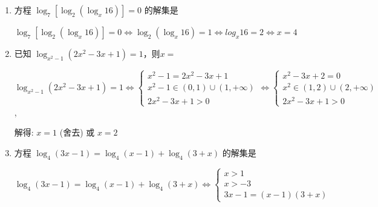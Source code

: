 \begin{enumerate}
    \item 方程 ${\log }_{7}\left\lbrack  {{\log }_{2}\left( {{\log }_{x}{16}}\right) }\right\rbrack   = 0$ 的解集是
    \begin{jieda}
        ${\log }_{7}\left\lbrack  {{\log }_{2}\left( {{\log }_{x}{16}}\right) }\right\rbrack   = 0 \Longleftrightarrow {{\log }_{2}\left( {{\log }_{x}{16}}\right) } = 1 \Longleftrightarrow log_x16 = 2 \Longleftrightarrow x = 4$
    \end{jieda}
    \item 已知 ${\log }_{{x}^{2} - 1}\left( {2{x}^{2} - {3x} + 1}\right)  = 1$，则$x = $
    \begin{jieda}
    
        ${\log }_{{x}^{2} - 1}\left( {2{x}^{2} - {3x} + 1}\right)  = 1 \Longleftrightarrow  \left\{\begin{array}{l}
             {x}^{2} - 1 = 2{x}^{2} - {3x} + 1  \\
             x^2-1 \in (0, 1) \cup (1, +\infty) \\
             2{x}^{2} - {3x} + 1 > 0
        \end{array}\right . \Longleftrightarrow \left\{\begin{array}{l}
             {x}^{2} - {3x} + 2 = 0  \\
             x^2 \in (1, 2) \cup (2, +\infty) \\
             2{x}^{2} - {3x} + 1 > 0
        \end{array}\right .$ ,

        解得: $x = 1$ (舍去) 或 $x = 2$
    \end{jieda}
    
    \item 方程 ${\log }_{4}\left( {{3x} - 1}\right)  = {\log }_{4}\left( {x - 1}\right)  + {\log }_{4}\left( {3 + x}\right)$ 的解集是
    \begin{jieda}
        ${\log }_{4}\left( {{3x} - 1}\right)  = {\log }_{4}\left( {x - 1}\right)  + {\log }_{4}\left( {3 + x}\right) \Longleftrightarrow \left\{\begin{array}{l}
             x > 1  \\
             x > -3 \\
             3x-1 = (x-1)(3+x)
        \end{array}\right.$


\end{jieda}
\end{enumerate}

